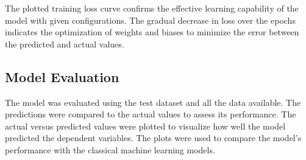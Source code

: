The plotted training loss curve confirms the effective learning capability of the model with given configurations. The gradual decrease in loss over the epochs indicates the optimization 
of weights and biases to minimize the error between the predicted and actual values.

\subsection*{Model Evaluation}

The model was evaluated using the test dataset and all the data available. The predictions were compared to the actual values to assess its performance.
The actual versus predicted values were plotted to visualize how well the model predicted the dependent variables. The plots were used to compare the model's performance with the
classical machine learning models.

